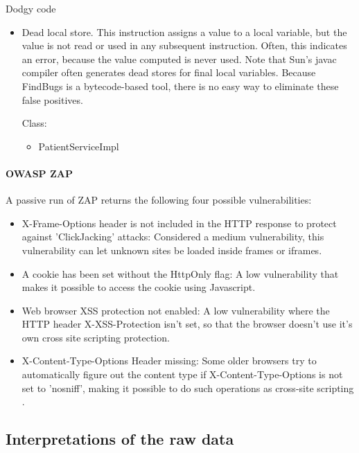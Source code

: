 \documentclass{report} %
\begin{document}
Dodgy code
  \begin{itemize}
    \item Dead local store. This instruction assigns a value to a local variable, but the
      value is not read or used in any subsequent instruction. Often, this
      indicates an error, because the value computed is never used.
      Note that Sun's javac compiler often generates dead stores for final
      local variables. Because FindBugs is a bytecode-based tool, there is
      no easy way to eliminate these false positives.

      Class:
      \begin{itemize}

        \item PatientServiceImpl
      \end{itemize}
  \end{itemize}
\paragraph{OWASP ZAP}

A passive run of ZAP returns the following four possible vulnerabilities:

\begin{itemize}
 \item X-Frame-Options header is not included in the HTTP response to protect against
  'ClickJacking' attacks: Considered a medium vulnerability, this
  vulnerability can let unknown sites be loaded inside frames or iframes.
 \item A cookie has been set without the HttpOnly flag: A low vulnerability that
   makes it possible to access the cookie using Javascript. 
 \item Web browser XSS protection not enabled: A low vulnerability where the
   HTTP header X-XSS-Protection isn't set, so that the browser doesn't use it's
   own cross site scripting protection.
 \item X-Content-Type-Options Header missing: Some older browsers try to
   automatically figure out the content type if X-Content-Type-Options is not
   set to 'nosniff', making it possible to do such operations as cross-site
   scripting \autocite[]{XFrame}.
\end{itemize}

\subsection{Interpretations of the raw data}
\end{document}
